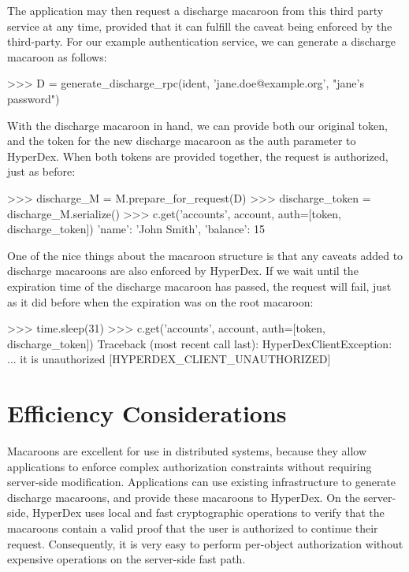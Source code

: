 The application may then request a discharge macaroon from this third party
service at any time, provided that it can fulfill the caveat being enforced by
the third-party. For our example authentication service, we can generate a
discharge macaroon as follows:

\begin{pythoncode}
>>> D = generate_discharge_rpc(ident, 'jane.doe@example.org', "jane's password")
\end{pythoncode}

With the discharge macaroon in hand, we can provide both our original token, and
the token for the new discharge macaroon as the auth parameter to HyperDex.
When both tokens are provided together, the request is authorized, just as
before:

\begin{pythoncode}
>>> discharge_M = M.prepare_for_request(D)
>>> discharge_token = discharge_M.serialize()
>>> c.get('accounts', account, auth=[token, discharge_token])
{'name': 'John Smith', 'balance': 15}
\end{pythoncode}

One of the nice things about the macaroon structure is that any caveats added to
discharge macaroons are also enforced by HyperDex.  If we wait until the
expiration time of the discharge macaroon has passed, the request will fail,
just as it did before when the expiration was on the root macaroon:

\begin{pythoncode}
>>> time.sleep(31)
>>> c.get('accounts', account, auth=[token, discharge_token])
Traceback (most recent call last):
HyperDexClientException: ... it is unauthorized [HYPERDEX_CLIENT_UNAUTHORIZED]
\end{pythoncode}

\section{Efficiency Considerations}

Macaroons are excellent for use in distributed systems, because they allow
applications to enforce complex authorization constraints without requiring
server-side modification.  Applications can use existing infrastructure to
generate discharge macaroons, and provide these macaroons to HyperDex.  On the
server-side, HyperDex uses local and fast cryptographic operations to verify
that the macaroons contain a valid proof that the user is authorized to continue
their request.  Consequently, it is very easy to perform per-object
authorization without expensive operations on the server-side fast path.
